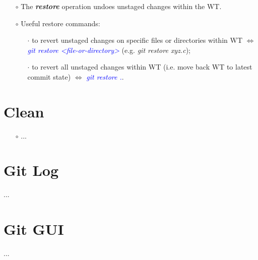 \documentclass[a4paper,portrait,10pt]{article}   %
\newcommand{\mydiv}{$\Leftrightarrow$ }   %
\newcommand{\mycmd}[1]{\textcolor{blue}{\textit{#1}}}   %
\newcommand{\myvspace}{\vspace{4mm}}   %
\begin{document}
\begin{itemize}
\item[$\circ$] The \textbf{\textit{restore}} operation undoes unstaged changes within the WT.

\item[$\circ$] Useful restore commands:
\begin{itemize}
  \item[$\cdot$] to revert unstaged changes on specific files or directories within WT \mydiv \mycmd{git restore <file-or-directory>} (e.g. \textit{git restore xyz.c});
  \item[$\cdot$] to revert all unstaged changes within WT (i.e. move back WT to latest commit state) \mydiv \mycmd{git restore .}.
\end{itemize}
\end{itemize}
\myvspace


\section{Clean}   \label{sec:Clean}

\begin{itemize}
\item[$\circ$] ...

\end{itemize}
\myvspace







\section{Git Log}   \label{sec:GitLog}
...


\section{Git GUI}   \label{sec:GitGui}
...
  
\end{document}
